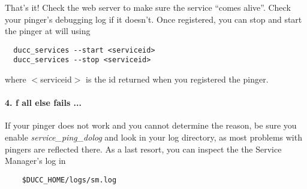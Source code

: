       That's it!  Check the web server to make sure the service ``comes alive''.  Check your pinger's
      debugging log if it doesn't.  Once registered, you can stop and start the pinger at will using
\begin{verbatim}
  ducc_services --start <serviceid>
  ducc_services --stop <serviceid>
\end{verbatim}
     where $<$serviceid$>$ is the id returned when you registered the pinger.

     \paragraph{4. f all else fails ...}
     If your pinger does not work and you cannot determine the reason, be sure you enable {\em service\_ping\_dolog} and
     look in your log directory, as most problems with pingers are reflected there.  As a last resort, you can
     inspect the the Service Manager's log in
\begin{verbatim}
    $DUCC_HOME/logs/sm.log
\end{verbatim}
     

